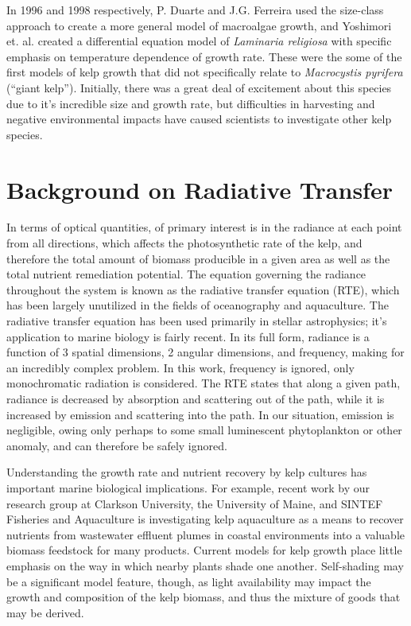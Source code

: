 In 1996 and 1998 respectively, P. Duarte and J.G. Ferreira used the size-class approach to create a more general model of macroalgae growth, and Yoshimori et. al. created a differential equation model of \textit{Laminaria religiosa} with specific emphasis on temperature dependence of growth rate\cite{duarte_model_1997,yoshimori_mathematical_1998}.
These were the some of the first models of kelp growth that did not specifically relate to \textit{Macrocystis pyrifera} (``giant kelp''). 
Initially, there was a great deal of excitement about this species due to it's incredible size and growth rate, but difficulties in harvesting and negative environmental impacts have caused scientists to investigate other kelp species. %

\section{Background on Radiative Transfer}
In terms of optical quantities, of primary interest is in the radiance at each point from all directions, which affects the photosynthetic rate of the kelp, and therefore the total amount of biomass producible in a given area as well as the total nutrient remediation potential.
The equation governing the radiance throughout the system is known as the radiative transfer equation (RTE), which has been largely unutilized in the fields of oceanography and aquaculture.
The radiative transfer equation has been used primarily in stellar astrophysics; it's application to marine biology is fairly recent\cite{mobley_radiative_2001}.
In its full form, radiance is a function of 3 spatial dimensions, 2 angular dimensions, and frequency, making for an incredibly complex problem. %
In this work, frequency is ignored, only monochromatic radiation is considered.
The RTE states that along a given path, radiance is decreased by absorption and scattering out of the path, while it is increased by emission and scattering into the path.
In our situation, emission is negligible, owing only perhaps to some small luminescent phytoplankton or other anomaly, and can therefore be safely ignored.

Understanding the growth rate and nutrient recovery by
kelp cultures has important marine biological implications. For example, recent
work by our research group at Clarkson University, the University of Maine, and
SINTEF Fisheries and Aquaculture is investigating kelp aquaculture as a means to
recover nutrients from wastewater effluent plumes in coastal environments into a
valuable biomass feedstock for many products. Current models for kelp growth
place little emphasis on the way in which nearby plants shade one another.
Self-shading may be a significant model feature, though, as light availability
may impact the growth and composition of the kelp biomass, and thus the mixture
of goods that may be derived.

